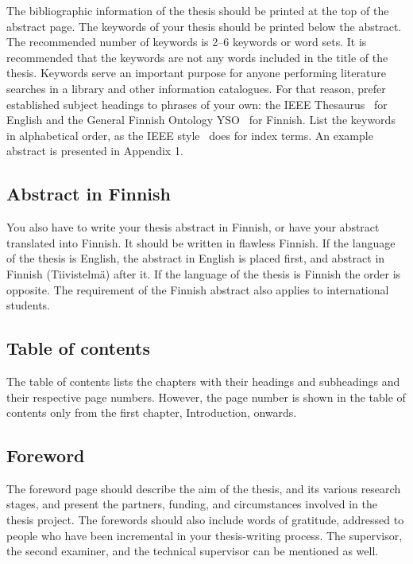 The bibliographic information of the thesis should be printed at the top of the abstract page. The keywords of your thesis should be printed below the abstract. The recommended number of keywords is 2--6 keywords or word sets. It is recommended that the keywords are not any words included in the title of the thesis. Keywords serve an important purpose for anyone performing literature searches in a library and other information catalogues. For that reason, prefer established subject headings to phrases of your own: the IEEE Thesaurus~\cite{ieeethesaurus} for English and the General Finnish Ontology YSO~\cite{yso} for Finnish. List the keywords in alphabetical order, as the IEEE style~\cite{ieeetransactions} does for index terms. An example abstract is presented in Appendix 1.

\subsection{Abstract in Finnish}

You also have to write your thesis abstract in Finnish, or have your abstract translated into Finnish. It should be written in flawless Finnish. If the language of the thesis is English, the abstract in English is placed first, and abstract in Finnish (Tiivistelmä) after it. If the language of the thesis is Finnish the order is opposite. The requirement of the Finnish abstract also applies to international students.

\subsection{Table of contents}

The table of contents lists the chapters with their headings and subheadings and their respective page numbers. However, the page number is shown in the table of contents only from the first chapter, Introduction, onwards.

\subsection{Foreword}

The foreword page should describe the aim of the thesis, and its various research stages, and present the partners, funding, and circumstances involved in the thesis project. The forewords should also include words of gratitude, addressed to people who have been incremental in your thesis-writing process. The supervisor, the second examiner, and the technical supervisor can be mentioned as well.

